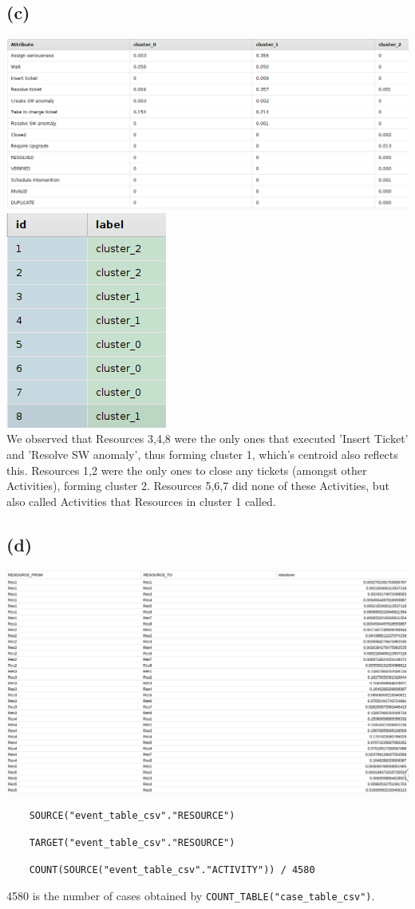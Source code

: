 \documentclass[../../main.tex]{subfiles}
\begin{document}
\subsection*{(c)}
\includegraphics[width=0.75\columnwidth]{img/RapidMiner_c_Centriods.png}
\includegraphics[width=0.25\columnwidth]{img/RapidMiner_c_Clustering.png}\\
We observed that Resources 3,4,8 were the only ones that executed 'Insert Ticket' and 'Resolve SW anomaly', thus forming cluster 1, which's centroid also reflects this. Resources 1,2 were the only ones to close any tickets (amongst other Activities), forming cluster 2. Resources 5,6,7 did none of these Activities, but also called Activities that Resources in cluster 1 called.


\subsection*{(d)}
\includegraphics[width=\columnwidth]{img/Celonis_d_OLAP.png}\\
\begin{verbatim}
	SOURCE("event_table_csv"."RESOURCE")
\end{verbatim}
\begin{verbatim}
	TARGET("event_table_csv"."RESOURCE")
\end{verbatim}
\begin{lstlisting}
	COUNT(SOURCE("event_table_csv"."ACTIVITY")) / 4580
\end{lstlisting}
4580 is the number of cases obtained by \verb|COUNT_TABLE("case_table_csv")|.
\end{document}
